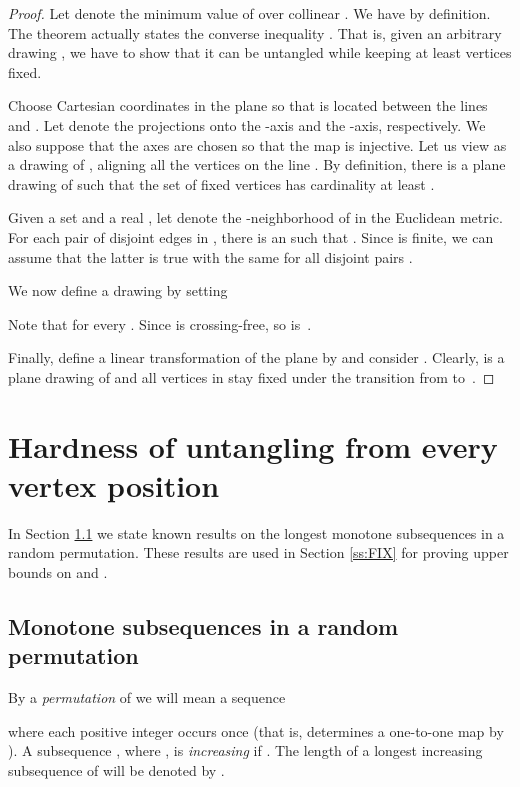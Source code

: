\documentclass[reqno,12pt]{amsart}
\begin{document}
\begin{proof} 
Let  denote the minimum value of  over collinear .
We have  by definition.
The theorem actually states the converse inequality .
That is, given an arbitrary drawing , we have to
show that it can be untangled while keeping at least  vertices fixed.

Choose Cartesian coordinates in the plane so that  is located between
the lines  and . Let  denote the projections 
onto the -axis and the -axis, respectively. We also suppose that the axes
are chosen so that the map  is injective. 
Let us view  as a drawing of , aligning all the vertices on the line .
By definition, there is a plane drawing  of  such that 
the set of fixed vertices 
has cardinality at least . 

Given a set  and a real , let 
denote the -neighborhood of  in the Euclidean metric. 
For each pair of disjoint edges 
in , there is an  such that .
Since  is finite, we can assume that the latter is true with the same
 for all disjoint pairs . 

We now define a drawing 
by setting

Note that  for every .
Since  is crossing-free, so is~.

Finally, define a linear transformation of the plane by 
and consider . Clearly,  is a plane drawing of  and all
vertices in  stay fixed under the transition from  to~.
\end{proof}


\section{Hardness of untangling from every vertex position}\label{s:fixx}


In Section \ref{ss:monoton} we state known results on the longest monotone subsequences
in a random permutation. These results are used in Section \ref{ss:FIX} for
proving upper bounds on  and .

\subsection{Monotone subsequences in a random permutation}\label{ss:monoton}

By a \emph{permutation} of  we will mean a sequence

where each positive integer  occurs once (that is,  determines a
one-to-one map  by ).
A subsequence , where ,
is \emph{increasing} if .
The length of a longest increasing subsequence of  will be
denoted by . 
\end{document}

